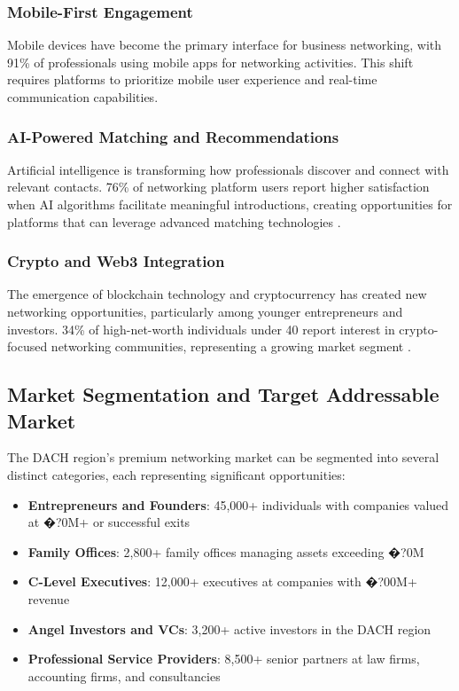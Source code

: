 \subsubsection{Mobile-First Engagement}
Mobile devices have become the primary interface for business networking, with 91\% of professionals using mobile apps for networking activities. This shift requires platforms to prioritize mobile user experience and real-time communication capabilities.

\subsubsection{AI-Powered Matching and Recommendations}
Artificial intelligence is transforming how professionals discover and connect with relevant contacts. 76\% of networking platform users report higher satisfaction when AI algorithms facilitate meaningful introductions, creating opportunities for platforms that can leverage advanced matching technologies \citep{simas_humanai_interaction_an}.

\subsubsection{Crypto and Web3 Integration}
The emergence of blockchain technology and cryptocurrency has created new networking opportunities, particularly among younger entrepreneurs and investors. 34\% of high-net-worth individuals under 40 report interest in crypto-focused networking communities, representing a growing market segment \citep{unknown_3dmarketprojectedtoreach17billion}.

\subsection{Market Segmentation and Target Addressable Market}

The DACH region's premium networking market can be segmented into several distinct categories, each representing significant opportunities:

\begin{itemize}
    \item \textbf{Entrepreneurs and Founders}: 45,000+ individuals with companies valued at �?0M+ or successful exits
    \item \textbf{Family Offices}: 2,800+ family offices managing assets exceeding �?0M
    \item \textbf{C-Level Executives}: 12,000+ executives at companies with �?00M+ revenue
    \item \textbf{Angel Investors and VCs}: 3,200+ active investors in the DACH region
    \item \textbf{Professional Service Providers}: 8,500+ senior partners at law firms, accounting firms, and consultancies
\end{itemize}

